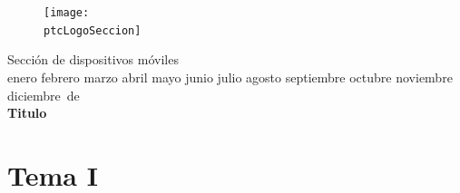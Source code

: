 \documentclass[a4paper,12pt]{article}
\newcommand{\MONTH}{%
  \ifcase\the\month
  \or enero%
  \or febrero%
  \or marzo%
  \or abril%
  \or mayo%
  \or junio%
  \or julio%
  \or agosto%
  \or septiembre%
  \or octubre%
  \or noviembre%
  \or diciembre%
  \fi
}
\newcommand{\protecoTitle}{
  \begin{minipage}[t]{0.6\textwidth}
    \vspace{0.1cm}
    \Large{\ptcSeccion}\\
    \MONTH\,de\,\the\year\\
    \textbf{\LARGE{\ptcTitulo}}\\
  \end{minipage}

}
\newcommand{\putLogo}{
  \begin{figure} %
      \centering
      \vspace{0.1cm}
      \texttt{[image: \\ptcLogoSeccion]}
      \vspace{-110pt} %
  \end{figure}
}
\begin{document}

\graphicspath{ {image/}{assets/}{assets/logos/} }

\newcommand{\ptcSeccion}{Sección de dispositivos móviles}
\newcommand{\ptcTitulo}{Titulo}
\newcommand{\ptcLogoSeccion}{smartphone}

\putLogo
\protecoTitle


\section{Tema I}
\selectfont

\end{document}
